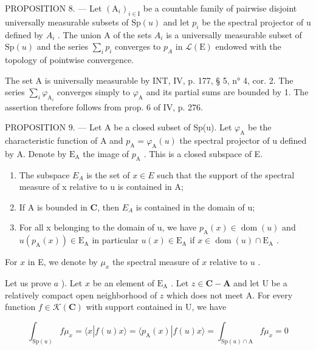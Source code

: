 PROPOSITION 8. --- Let \((\mathrm{A}_{i})_{i\in\mathrm{I}}\) be a countable family of pairwise disjoint universally measurable subsets of \(\mathrm{Sp}(u)\) and let \(p_{i}\) be the spectral projector of u defined by \(A_{i}\) . The union A of the sets \(A_{i}\) is a universally measurable subset of \(\mathrm{Sp}(u)\) and the series \(\sum_{i}p_{i}\) converges to \(p_{A}\) in \(\mathcal{L}(\mathrm{E})\) endowed with the topology of pointwise convergence.

The set A is universally measurable by INT, IV, p. 177, § 5, n° 4, cor. 2. The series \(\sum_{i} \varphi_{\mathrm{A}_{i}}\) converges simply to \(\varphi_{\mathrm{A}}\) and its partial sums are bounded by 1. The assertion therefore follows from prop. 6 of IV, p. 276.

PROPOSITION 9. --- Let A be a closed subset of Sp(u). Let \(\varphi_{\mathrm{A}}\) be the characteristic function of A and \(p_{\mathrm{A}} = \varphi_{\mathrm{A}}(u)\) the spectral projector of u defined by A. Denote by \(\mathrm{E}_{\mathrm{A}}\) the image of \(p_{\mathrm{A}}\) . This is a closed subspace of E.

\begin{enumerate}
\def\labelenumi{\alph{enumi})}
\item
  The subspace \(E_{A}\) is the set of \(x \in E\) such that the support of the spectral measure of x relative to u is contained in A;
\item
  If A is bounded in \(\mathbf C\), then \(E_{A}\) is contained in the domain of u;
\item
  For all x belonging to the domain of u, we have \(p_{\mathrm{A}}(x) \in \operatorname{dom}(u)\) and \(u(p_{\mathrm{A}}(x)) \in \mathrm{E}_{\mathrm{A}}\) in particular \(u(x) \in \mathrm{E}_{\mathrm{A}}\) if \(x \in \operatorname{dom}(u) \cap \mathrm{E}_{\mathrm{A}}\) .
\end{enumerate}

For \(x\) in E, we denote by \(\mu_x\) the spectral measure of \(x\) relative to \(u\) .

Let us prove \(a\) ). Let \(x\) be an element of \(\mathrm{E}_{\mathrm{A}}\) . Let \(z \in \mathbf{C} - \mathbf{A}\) and let U be a relatively compact open neighborhood of \(z\) which does not meet A. For every function \(f \in \mathcal{K}(\mathbf{C})\) with support contained in U, we have

\[
\int_ {\mathrm{Sp} (u)} f \mu_ {x} = \langle x | f (u) x \rangle = \langle p _ {\mathrm{A}} (x) | f (u) x \rangle = \int_ {\mathrm{Sp} (u) \cap \mathrm{A}} f \mu_ {x} = 0
\]

